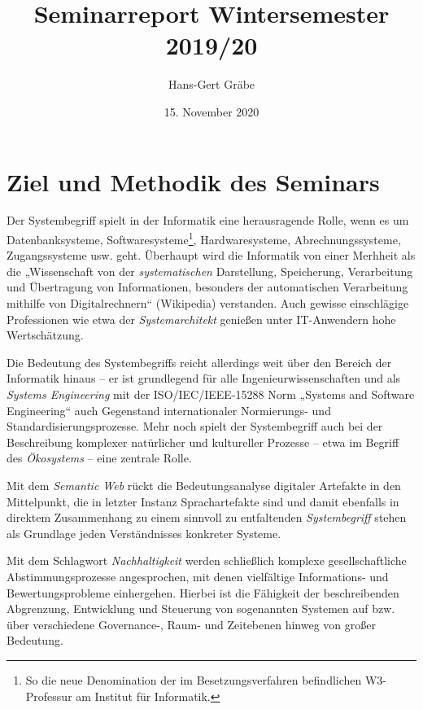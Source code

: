 \documentclass[11pt,a4paper]{article}
\title{Seminarreport Wintersemester 2019/20}
\author{Hans-Gert Gr\"abe}
\date{15. November 2020}
\begin{document}
\maketitle

\section{Ziel und Methodik des Seminars}

Der Systembegriff spielt in der Informatik eine herausragende Rolle, wenn es
um Datenbanksysteme, Softwaresysteme\footnote{So die neue Denomination der im
  Besetzungsverfahren befindlichen W3-Professur am Institut für Informatik.},
Hardwaresysteme, Abrechnungssysteme, Zugangssysteme usw. geht.  Überhaupt wird
die Informatik von einer Merhheit als die „Wissenschaft von der
\emph{systematischen} Darstellung, Speicherung, Verarbeitung und Übertragung
von Informationen, besonders der automatischen Verarbeitung mithilfe von
Digitalrechnern“ (Wikipedia) verstanden.  Auch gewisse einschlägige
Professionen wie etwa der \emph{Systemarchitekt} genießen unter IT-Anwendern
hohe Wertschätzung.

Die Bedeutung des Systembegriffs reicht allerdings weit über den Bereich der
Informatik hinaus -- er ist grundlegend für alle Ingenieurwissenschaften und
als \emph{Systems Engineering} mit der ISO/IEC/IEEE-15288 Norm „Systems and
Software Engineering“ auch Gegenstand internationaler Normierungs- und
Standardisierungsprozesse.  Mehr noch spielt der Systembegriff auch bei der
Beschreibung komplexer natürlicher und kultureller Prozesse -- etwa im Begriff
des \emph{Ökosystems} -- eine zentrale Rolle.

Mit dem \emph{Semantic Web} rückt die Bedeutungsanalyse digitaler Artefakte in
den Mittelpunkt, die in letzter Instanz Sprachartefakte sind und damit
ebenfalls in direktem Zusammenhang zu einem sinnvoll zu entfaltenden
\emph{Systembegriff} stehen als Grundlage jeden Verständnisses konkreter
Systeme.

Mit dem Schlagwort \emph{Nachhaltigkeit} werden schließlich komplexe
gesellschaftliche Abstimmungsprozesse angesprochen, mit denen vielfältige
Informations- und Bewertungsprobleme einhergehen. Hierbei ist die Fähigkeit
der beschreibenden Abgrenzung, Entwicklung und Steuerung von sogenannten
Systemen auf bzw. über verschiedene Governance-, Raum- und Zeitebenen hinweg
von großer Bedeutung.
\end{document}

